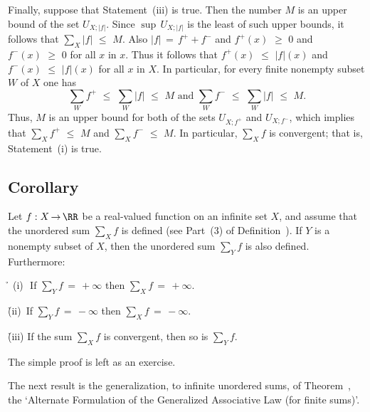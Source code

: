         Finally, suppose that Statement~(iii) is true. Then the number $M$ is an upper bound of the set $U_{X;|f|}$. Since ${\sup}\,U_{X;|f|}$ is the least of such upper bounds, it follows that ${\sum}_{X} |f|\,\,{\leq}\,\,M$.
    Also $|f| \,=\, f^{+} + f^{-}$ and $f^{+}(x)\,\,{\geq}\,\,0$ and $f^{-}(x)\,\,{\geq}\,\,0$ for all $x$ in $x$.
    Thus it follows that $f^{+}(x)\,\,{\leq}\,\,|f|(x)$ and $f^{-}(x)\,\,{\leq}\,\,|f|(x)$ for all $x$ in $X$.
    In particular, for every finite nonempty subset $W$ of $X$ one has
        \begin{displaymath}
        {\sum}_{W} f^{+}\,\,{\leq}\,\,{\sum}_{W} |f|\,\,{\leq}\,\,M
    \mbox{ and }
        {\sum}_{W} f^{-}\,\,{\leq}\,\,{\sum}_{W} |f|\,\,{\leq}\,\,M.
        \end{displaymath}
    Thus, $M$ is an upper bound for both of the sets $U_{X;f^{+}}$ and $U_{X;f^{-}}$, which implies that ${\sum}_{X} f^{+}\,\,{\leq}\,\,M$ and ${\sum}_{X} f^{-}\,\,{\leq}\,\,M$.
    In particular, ${\sum}_{X} f$ is convergent; that is, Statement~(i) is true.

\V

            \subsection{\small{\bf Corollary}}
            \label{CorG20.67}


        Let $f:X \,{\rightarrow}\, {\RR}$ be a real-valued function on an infinite set $X$,
    and assume that the unordered sum ${\sum}_{X} f$ is defined (see Part~(3) of Definition~).
    If $Y$ is a nonempty subset of $X$, then the unordered sum ${\sum}_{Y} f$ is also defined. Furthermore:

        \h \, (i)\,\, If ${\sum}_{Y} f \,=\, +{\infty}$ then ${\sum}_{X} f \,=\, +{\infty}$.

        \h (ii)\, If ${\sum}_{Y} f \,=\, -{\infty}$ then ${\sum}_{X} f \,=\, -{\infty}$.

        \h (iii) If the sum ${\sum}_{X} f$ is convergent, then so is ${\sum}_{Y} f$.

\V
        
        The simple proof is left as an exercise.

\V
\V


        The next result is the generalization, to infinite unordered sums, of Theorem~, the `Alternate Formulation of the Generalized Associative Law (for finite sums)'.

\V

